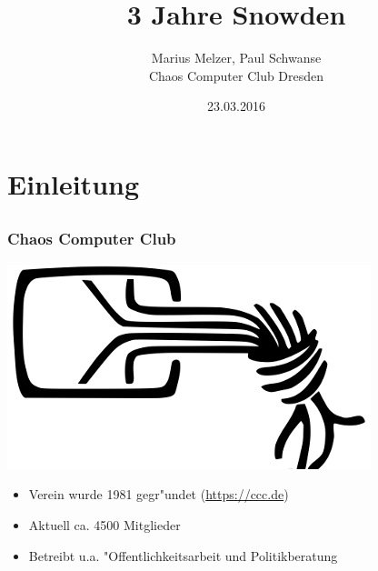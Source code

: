 \documentclass[12pt, xcolor={svgnames,table}]{beamer}
\title{3 Jahre Snowden}
\author{\small Marius Melzer, Paul Schwanse\\\large Chaos Computer Club Dresden}
\date{23.03.2016}
\begin{document}
\maketitle

\section{Einleitung}
\subsection{}

\begin{frame}
    \frametitle{Chaos Computer Club}
    \begin{center}
	\includegraphics[height=0.2\textheight]{img/chaosknoten.png}
    \end{center}	
    \begin{itemize}
      \item<1-> Verein wurde 1981 gegr"undet (\url{https://ccc.de})          
      \item<2-> Aktuell ca. 4500 Mitglieder
      \item<3-> Betreibt u.a. "Offentlichkeitsarbeit und Politikberatung      
    \end{itemize}
\end{frame}
\end{document}
